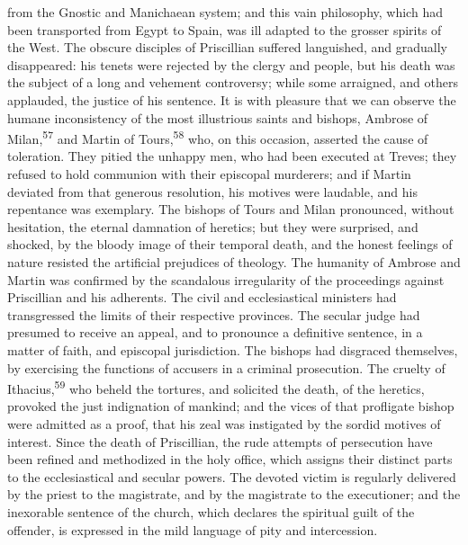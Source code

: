 from the Gnostic and Manichaean system; and this vain philosophy,
which had been transported from Egypt to Spain, was ill adapted
to the grosser spirits of the West. The obscure disciples of
Priscillian suffered languished, and gradually disappeared: his
tenets were rejected by the clergy and people, but his death was
the subject of a long and vehement controversy; while some
arraigned, and others applauded, the justice of his sentence. It
is with pleasure that we can observe the humane inconsistency of
the most illustrious saints and bishops, Ambrose of Milan,\textsuperscript{57} and
Martin of Tours,\textsuperscript{58} who, on this occasion, asserted the cause of
toleration. They pitied the unhappy men, who had been executed at
Treves; they refused to hold communion with their episcopal
murderers; and if Martin deviated from that generous resolution,
his motives were laudable, and his repentance was exemplary. The
bishops of Tours and Milan pronounced, without hesitation, the
eternal damnation of heretics; but they were surprised, and
shocked, by the bloody image of their temporal death, and the
honest feelings of nature resisted the artificial prejudices of
theology. The humanity of Ambrose and Martin was confirmed by the
scandalous irregularity of the proceedings against Priscillian
and his adherents. The civil and ecclesiastical ministers had
transgressed the limits of their respective provinces. The
secular judge had presumed to receive an appeal, and to pronounce
a definitive sentence, in a matter of faith, and episcopal
jurisdiction. The bishops had disgraced themselves, by exercising
the functions of accusers in a criminal prosecution. The cruelty
of Ithacius,\textsuperscript{59} who beheld the tortures, and solicited the death,
of the heretics, provoked the just indignation of mankind; and
the vices of that profligate bishop were admitted as a proof,
that his zeal was instigated by the sordid motives of interest.
Since the death of Priscillian, the rude attempts of persecution
have been refined and methodized in the holy office, which
assigns their distinct parts to the ecclesiastical and secular
powers. The devoted victim is regularly delivered by the priest
to the magistrate, and by the magistrate to the executioner; and
the inexorable sentence of the church, which declares the
spiritual guilt of the offender, is expressed in the mild
language of pity and intercession.


